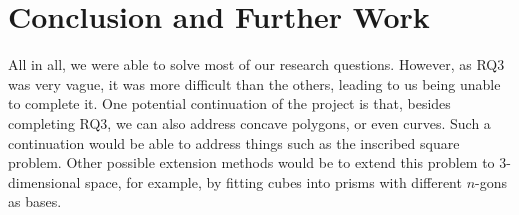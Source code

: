\documentclass[12pt]{scrartcl}
\begin{document}
\section{Conclusion and Further Work}
All in all, we were able to solve most of our research questions.
However, as RQ3 was very vague, it was more difficult than the others, leading to us being unable to complete it.
One potential continuation of the project is that, besides completing RQ3, we can also address concave polygons,
or even curves. Such a continuation would be able to address things such as the inscribed square problem.
Other possible extension methods would be to extend this problem to 3-dimensional space, for example, by
fitting cubes into prisms with different $n$-gons as bases.

\printbibliography
\end{document}
